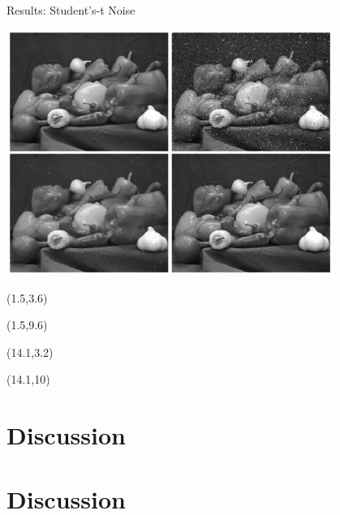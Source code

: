 \documentclass[12pt]{beamer}
\begin{document}
\begin{frame}{Results: Student's-t Noise}
\begin{center}
\vspace{-3 mm}
\includegraphics[width = 0.8\textwidth]{../figures/student-t_peppers.png} 
\end{center}

\begin{textblock}{5}(1.5,3.6)
\end{textblock}

\begin{textblock}{5}(1.5,9.6)
\end{textblock}

\begin{textblock}{5}(14.1,3.2)
\end{textblock}

\begin{textblock}{5}(14.1,10)
\end{textblock}

\end{frame}

\section{Discussion}

\section{Discussion}
\end{document}
